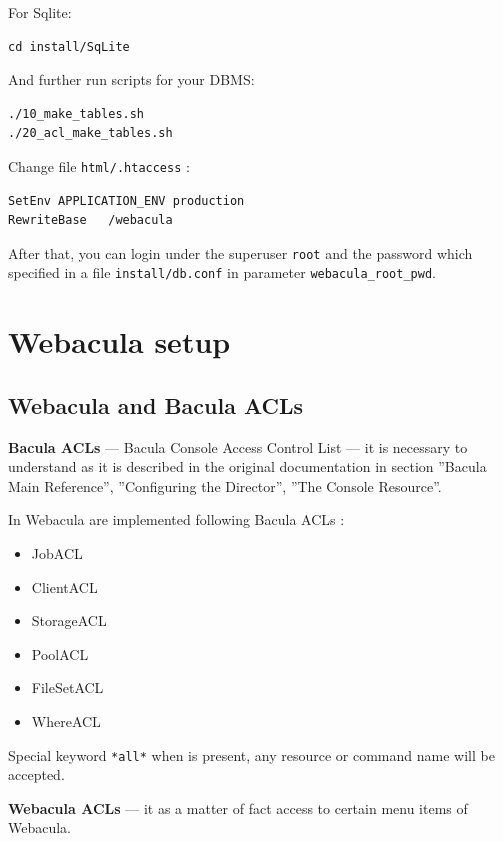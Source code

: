 \documentclass[10pt]{article}
\begin{document}
For Sqlite:
\begin{verbatim}
cd install/SqLite
\end{verbatim}

And further run scripts for your DBMS:
\begin{verbatim}
./10_make_tables.sh
./20_acl_make_tables.sh
\end{verbatim}

Change file \texttt{html/.htaccess} :
\begin{verbatim}
SetEnv APPLICATION_ENV production
RewriteBase   /webacula
\end{verbatim}

After that, you can login under the superuser \texttt{root} and the password which specified in a file \texttt{install/db.conf}
in parameter \texttt{webacula\_root\_pwd}.



\section{Webacula setup}
\label{Setup}



\subsection{Webacula and Bacula ACLs}
\label{Setup:Webacula and Bacula ACLs}

\textbf{Bacula ACLs} --- Bacula Console Access Control List --- 
it is necessary to understand as it is described in the original documentation in section 
''Bacula Main Reference'', ''Configuring the Director'', ''The Console Resource''.

In Webacula are implemented following Bacula ACLs :
\begin{itemize}
  \item JobACL
  \item ClientACL
  \item StorageACL
  \item PoolACL
  \item FileSetACL
  \item WhereACL
\end{itemize}

Special keyword \texttt{*all*} when is present, any resource or command name will be accepted.

\textbf{Webacula ACLs} --- it as a matter of fact access to certain menu items of Webacula.
\end{document}
